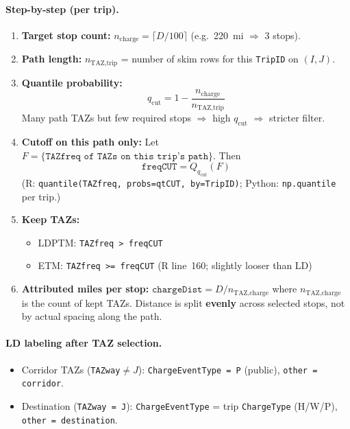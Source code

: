\documentclass[11pt,a4paper]{article}
\begin{document}
\paragraph{Step-by-step (per trip).}
\begin{enumerate}
  \item \textbf{Target stop count:} $n_{\text{charge}} = \lceil D/100 \rceil$ (e.g.\ 220~mi $\Rightarrow$ 3 stops).
  \item \textbf{Path length:} $n_{\text{TAZ,trip}}$ = number of skim rows for this \texttt{TripID} on $(I,J)$.
  \item \textbf{Quantile probability:}
  \begin{equation}
    q_{\text{cut}} = 1 - \frac{n_{\text{charge}}}{n_{\text{TAZ,trip}}}
  \end{equation}
  \noindent Many path TAZs but few required stops $\Rightarrow$ high $q_{\text{cut}}$ $\Rightarrow$ stricter filter.
  \item \textbf{Cutoff on this path only:} Let $F = \{\texttt{TAZfreq of TAZs on this trip's path}\}$. Then
  \begin{equation}
    \texttt{freqCUT} = Q_{q_{\text{cut}}}(F)
  \end{equation}
  \noindent (R: \texttt{quantile(TAZfreq, probs=qtCUT, by=TripID)}; Python: \texttt{np.quantile} per trip.)
  \item \textbf{Keep TAZs:}
  \begin{itemize}[noitemsep]
    \item LDPTM: \texttt{TAZfreq > freqCUT}
    \item ETM: \texttt{TAZfreq >= freqCUT} (R line~160; slightly looser than LD)
  \end{itemize}
  \item \textbf{Attributed miles per stop:} $\texttt{chargeDist} = D / n_{\text{TAZ,charge}}$ where $n_{\text{TAZ,charge}}$ is the count of kept TAZs. Distance is split \textbf{evenly} across selected stops, not by actual spacing along the path.
\end{enumerate}

\paragraph{LD labeling after TAZ selection.}
\begin{itemize}[noitemsep]
  \item Corridor TAZs (\texttt{TAZway}$\neq J$): \texttt{ChargeEventType = P} (public), \texttt{other = corridor}.
  \item Destination (\texttt{TAZway = J}): \texttt{ChargeEventType} = trip \texttt{ChargeType} (H/W/P), \texttt{other = destination}.
\end{itemize}
\end{document}
